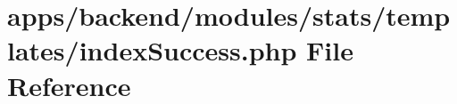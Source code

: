 \hypertarget{backend_2modules_2stats_2templates_2index_success_8php}{\section{apps/backend/modules/stats/templates/index\-Success.php File Reference}
\label{backend_2modules_2stats_2templates_2index_success_8php}
}
